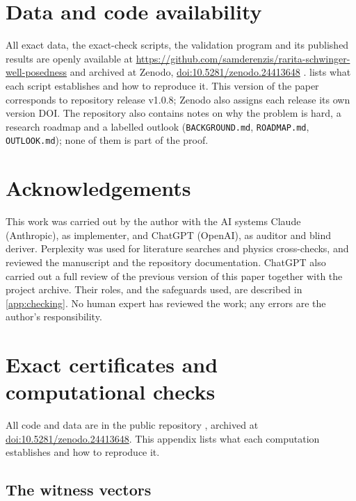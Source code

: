\documentclass[11pt]{article}
\theoremstyle{plain}
\theoremstyle{definition}
\theoremstyle{remark}
\begin{document}
\section*{Data and code availability}
All exact data, the exact-check scripts, the validation program and its published results are openly available at \url{https://github.com/samderenzis/rarita-schwinger-well-posedness} and archived at Zenodo, \href{https://doi.org/10.5281/zenodo.24413648}{doi:10.5281/zenodo.24413648} \citep{DeRenzisRepo}.  lists what each script establishes and how to reproduce it. This version of the paper corresponds to repository release v1.0.8; Zenodo also assigns each release its own version DOI. The repository also contains notes on why the problem is hard, a research roadmap and a labelled outlook (\texttt{BACKGROUND.md}, \texttt{ROADMAP.md}, \texttt{OUTLOOK.md}); none of them is part of the proof.

\section*{Acknowledgements}
This work was carried out by the author with the AI systems Claude (Anthropic), as implementer, and ChatGPT (OpenAI), as auditor and blind deriver. Perplexity was used for literature searches and physics cross-checks, and reviewed the manuscript and the repository documentation. ChatGPT also carried out a full review of the previous version of this paper together with the project archive. Their roles, and the safeguards used, are described in \cref{app:checking}. No human expert has reviewed the work; any errors are the author's responsibility.

\appendix
\section{Exact certificates and computational checks}\label{app:certificates}

All code and data are in the public repository \citep{DeRenzisRepo}, archived at \href{https://doi.org/10.5281/zenodo.24413648}{doi:10.5281/zenodo.24413648}. This appendix lists what each computation establishes and how to reproduce it.

\subsection{The witness vectors}\label{app:vectors}
\end{document}
